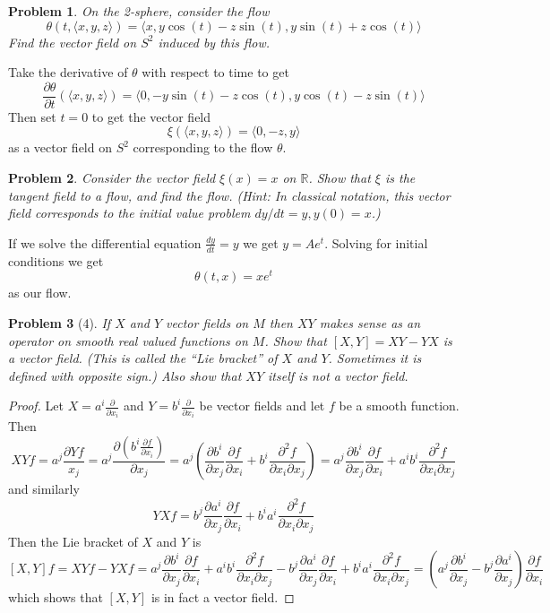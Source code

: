 \documentclass[10pt]{article}
\newcommand{\sk}{\vskip 10mm}
\newcommand{\bb}[1]{\mathbb{#1}}
\theoremstyle{plain}
\newtheorem{problem}{Problem}
\theoremstyle{remark}
\begin{document}
\begin{problem}
  On the 2-sphere, consider the flow
  \[
    \theta(t,\langle x,y,z\rangle)
    =\langle x,y\cos(t)-z\sin(t),y\sin(t)+z\cos(t)\rangle
  \]
  Find the vector field on $S^2$ induced by this flow.
\end{problem}

Take the derivative of $\theta$ with respect to time to get
\[
  \frac{\partial \theta}{\partial t}(\langle x,y,z\rangle) = \langle 0,-y\sin(t)-z\cos(t),y\cos(t)-z\sin(t)\rangle
\]
Then set $t=0$ to get the vector field
\[
  \xi(\langle x,y,z\rangle) = \langle 0,-z,y\rangle
\]
as a vector field on $S^2$ corresponding to the flow $\theta$.

\sk

\begin{problem}
  Consider the vector field $\xi(x)=x$ on $\bb{R}$. Show that $\xi$ is the
  tangent field to a flow, and find the flow. (Hint: In classical notation,
  this vector field corresponds to the initial value problem $dy/dt=y,y(0)=x$.)
\end{problem}

If we solve the differential equation $\frac{dy}{dt}=y$ we get
$y=Ae^t$. Solving for initial conditions we get
\[
  \theta(t,x)=xe^t
\]
as our flow.

\sk

\begin{problem}[4]
  If $X$ and $Y$ vector fields on $M$ then $XY$ makes sense as an operator
  on smooth real valued functions on $M$. Show that $[X,Y]=XY-YX$ is a vector
  field. (This is called the ``Lie bracket'' of $X$ and $Y$. Sometimes it is
  defined with opposite sign.) Also show that $XY$ itself is not a vector
  field.
\end{problem}

\begin{proof}
  Let $X=a^i\frac{\partial}{\partial x_i}$ and $Y=b^i\frac{\partial}{\partial x_i}$ be vector fields and let
  $f$ be a smooth function. Then
  \[
    XYf = a^j\frac{\partial Yf}{x_j}=a^j\frac{\partial(b^i\frac{\partial f}{\partial x_i})}{\partial x_j}=a^j(\frac{\partial b^i}{\partial x_j}\frac{\partial f}{\partial x_i}+b^i\frac{\partial^2 f}{\partial x_i\partial x_j}) = a^j\frac{\partial b^i}{\partial x_j}\frac{\partial f}{\partial x_i}+a^ib^i\frac{\partial^2 f}{\partial x_i\partial x_j}
  \]
  and similarly
  \[
    YXf = b^j\frac{\partial a^i}{\partial x_j}\frac{\partial f}{\partial x_i}+b^ia^i\frac{\partial^2 f}{\partial x_i\partial x_j}
  \]
  Then the Lie bracket of $X$ and $Y$ is
  \[
    [X,Y]f=XYf-YXf=a^j\frac{\partial b^i}{\partial x_j}\frac{\partial f}{\partial x_i}+a^ib^i\frac{\partial^2 f}{\partial x_i\partial x_j}-b^j\frac{\partial a^i}{\partial x_j}\frac{\partial f}{\partial x_i}+b^ia^i\frac{\partial^2 f}{\partial x_i\partial x_j} = (a^j\frac{\partial b^i}{\partial x_j}-b^j\frac{\partial a^i}{\partial x_j})\frac{\partial f}{\partial x_i}
  \]
  which shows that $[X,Y]$ is in fact a vector field.
\end{proof}
\end{document}

